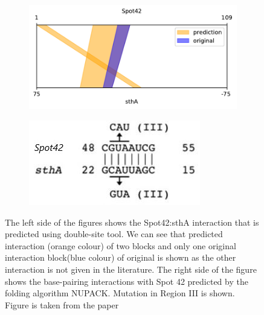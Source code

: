\documentclass[twoside,a4paper]{report}
\numberwithin{equation}{section}
\begin{document}


 \begin{figure}[h!tb]
	\centering
	\begin{subfigure}{.5\textwidth}
		\centering
		\includegraphics[width=1.0\linewidth]{rricomparison2}		
		\label{fig:rricomparison2}
	\end{subfigure}%
	\begin{subfigure}{.5\textwidth}
		\centering
		\includegraphics[width=.8\linewidth]{bei0}	
		\label{fig:bei0}
	\end{subfigure}
\caption{ The left side of the figures shows the Spot42:sthA interaction that is predicted using double-site tool. We can see that predicted interaction (orange colour) of two blocks and only one original interaction block(blue colour) of original is shown as the other interaction is not given in the literature.  The right side of the figure shows the base-pairing interactions with Spot 42 predicted by the folding algorithm NUPACK. Mutation in Region III is shown. Figure is taken from the paper \citep{beisel2011base}  }
\label{fig:bei2}
\end{figure}
\end{document}
